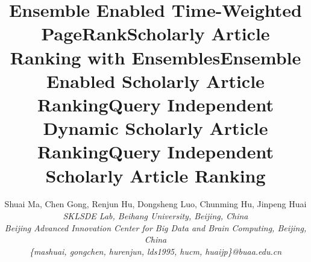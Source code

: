 \documentclass[10pt,conference,letterpaper]{IEEEtran}
\newcommand{\eat}[1]{}
\begin{document}
\title{Ensemble Enabled Time-Weighted PageRank}


\title{Scholarly Article Ranking with Ensembles}



\title{Ensemble Enabled Scholarly Article Ranking}


\title{Query Independent Dynamic Scholarly Article Ranking}

\title{Query Independent Scholarly Article Ranking}


\author{%
{Shuai Ma, Chen Gong, Renjun Hu, Dongsheng Luo, Chunming Hu, Jinpeng Huai}%
\vspace{1.6mm}\\
%
\fontsize{10}{10}\selectfont\itshape
SKLSDE Lab, Beihang University, Beijing, China\\
Beijing Advanced Innovation Center for Big Data and Brain Computing, Beijing, China\\
%
\fontsize{9}{9}\selectfont\ttfamily\upshape\vspace{0.5ex}
\{mashuai, gongchen, hurenjun, lds1995, hucm, huaijp\}@buaa.edu.cn
}

\eat{
\author{\IEEEauthorblockN{Shuai Ma, Chen Gong, Renjun Hu, Dongsheng Luo, Chunming Hu, Jinpeng Huai\\
{\small SKLSDE Lab, Beihang University, Beijing, China}\\
{\small Beijing Advanced Innovation Center for Big Data and Brain Computing, Beijing, China}\\
{\small \{mashuai, gongchen, hurenjun, lds1995, hucm, huaijp\}@buaa.edu.cn}}
}
}%

\eat{
\author{
Shuai Ma, Chen Gong, Renjun Hu, Dongsheng Luo, Chunming Hu, Jinpeng Huai}
\affiliation{%
  \institution{SKLSDE Lab, Beihang University, China}
  \institution{Beijing Advanced Innovation Center for Big Data and Brain Computing, China}
  \institution{\{mashuai, gongchen, hurenjun, lds1995, hucm, huaijp\}@buaa.edu.cn}
  }
}%

\maketitle
\end{document}
